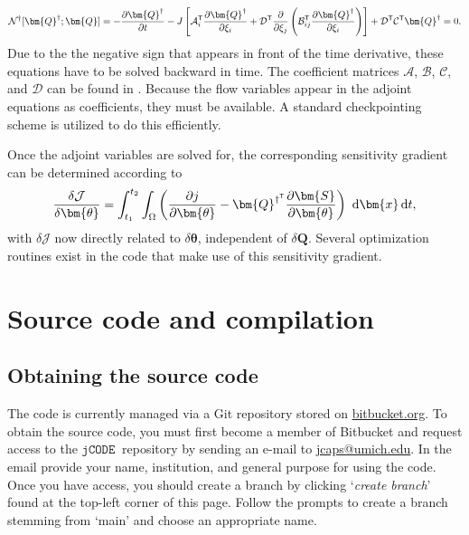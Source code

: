 \documentclass[12pt]{article}
\newcommand{\code}[1]{\texttt{#1}}
\newcommand{\jcode}{\code{jCODE}~}
\newcommand{\bitbucket}{\url{bitbucket.org}}
\begin{document}
\begin{equation}\label{adjEq}
\mathcal{N}^\dagger[\bm{Q}^\dagger;\bm{Q}]=-\frac{\partial \bm{Q}^\dagger}{\partial t}-J\left[\mathcal{A}_i^{\sf T} \frac{\partial \bm{Q}^\dagger}{\partial\xi_i}+\mathcal{D}^{\sf T} \frac{\partial}{\partial\xi_j}\left(\mathcal{B}_{ij}^{\sf T} \frac{\partial \bm{Q}^\dagger}{\partial\xi_i} \right)\right]+\mathcal{D}^{\sf T} \mathcal{C}^{\sf T} \bm{Q}^\dagger = 0.
\end{equation}
Due to the the negative sign that appears in front of the time derivative, these equations have to be solved backward in time. The coefficient matrices $\mathcal{A}$, $\mathcal{B}$, $\mathcal{C}$, and $\mathcal{D}$ can be found in \cite{capecelatro2018adjoint}. Because the flow variables appear in the adjoint equations as coefficients, they must be available. A standard checkpointing scheme is utilized to do this efficiently.

Once the adjoint variables are solved for, the corresponding sensitivity gradient can be determined according to
\begin{equation}\label{gradient}
\frac{\delta\mathcal{J}}{\delta\bm{\theta}}=\int_{t_1}^{t_2}\int_\Omega \left(\frac{\partial j}{\partial \bm{\theta}}-\bm{Q}^{\dagger^{\sf T}}\frac{\partial \bm{S}}{\partial\bm{\theta}}\right)~\text{d}\bm{x}\,\text{d}t,
\end{equation}
with $\delta\mathcal{J}$ now directly related to $\delta \bm{\theta}$, independent of $\delta \bm{Q}$. Several optimization routines exist in the code that make use of this sensitivity gradient.

\section{Source code and compilation}

\subsection{Obtaining the source code \label{sec:source}}
The code is currently managed via a Git repository stored on \bitbucket. To obtain the source code, you must first become a member of Bitbucket and request access to the $\jcode$ repository by sending an e-mail to \url{jcaps@umich.edu}. In the email provide your name, institution, and general purpose for using the code. Once you have access, you should create a branch by clicking `\textit{create branch}' found at the top-left corner of this page. Follow the prompts to create a branch stemming from `main' and choose an appropriate name. 
\end{document}
